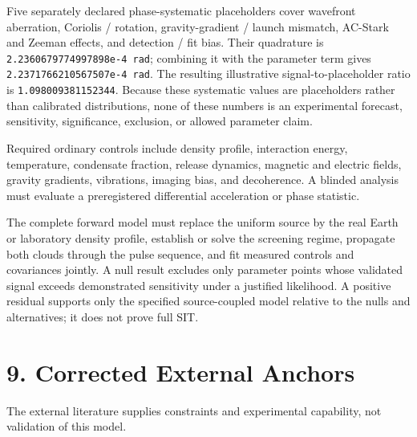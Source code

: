 \documentclass[
  american,
  11pt,
  letterpaper,
]{article}
\newcounter{none} %
\begin{document}
Five separately declared phase-systematic placeholders cover wavefront aberration, Coriolis / rotation, gravity-gradient / launch mismatch, AC-Stark and Zeeman effects, and detection / fit bias. Their quadrature is \texttt{2.2360679774997898e-4\ rad}; combining it with the parameter term gives \texttt{2.2371766210567507e-4\ rad}. The resulting illustrative signal-to-placeholder ratio is \texttt{1.098009381152344}. Because these systematic values are placeholders rather than calibrated distributions, none of these numbers is an experimental forecast, sensitivity, significance, exclusion, or allowed parameter claim.

Required ordinary controls include density profile, interaction energy, temperature, condensate fraction, release dynamics, magnetic and electric fields, gravity gradients, vibrations, imaging bias, and decoherence. A blinded analysis must evaluate a preregistered differential acceleration or phase statistic.

The complete forward model must replace the uniform source by the real Earth or laboratory density profile, establish or solve the screening regime, propagate both clouds through the pulse sequence, and fit measured controls and covariances jointly. A null result excludes only parameter points whose validated signal exceeds demonstrated sensitivity under a justified likelihood. A positive residual supports only the specified source-coupled model relative to the nulls and alternatives; it does not prove full SIT.

\section{9. Corrected External Anchors}\label{corrected-external-anchors}

The external literature supplies constraints and experimental capability, not validation of this model.
\end{document}
